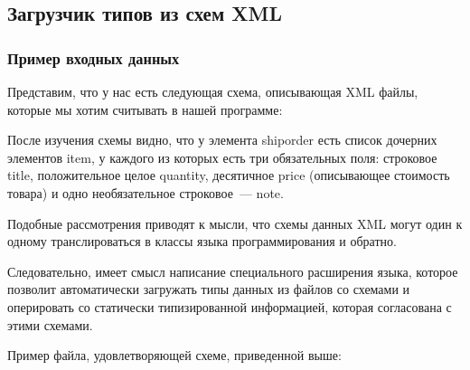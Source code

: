 \subsection{Загрузчик типов из схем XML}

\subsubsection{Пример входных данных}

Представим, что у нас есть следующая схема, описывающая XML файлы, которые мы хотим считывать в нашей программе:


После изучения схемы видно, что у элемента shiporder есть список дочерних элементов item, у каждого из которых есть три обязательных поля: строковое title, положительное целое quantity, десятичное price (описывающее стоимость товара) и одно необязательное строковое~--- note.

Подобные рассмотрения приводят к мысли, что схемы данных XML могут один к одному транслироваться в классы языка программирования и обратно.

Следовательно, имеет смысл написание специального расширения языка, которое позволит автоматически загружать типы данных из файлов со схемами и оперировать со статически типизированной информацией, которая согласована с этими схемами.

Пример файла, удовлетворяющей схеме, приведенной выше:



